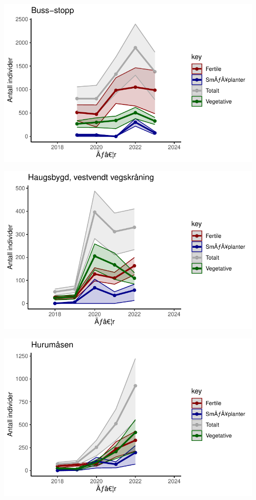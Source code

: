 \documentclass[
  letterpaper,
  DIV=11,
  numbers=noendperiod]{scrreport}
\begin{document}
\includegraphics{localEst_files/figure-pdf/unnamed-chunk-5-2.pdf}

\includegraphics{localEst_files/figure-pdf/unnamed-chunk-5-3.pdf}

\includegraphics{localEst_files/figure-pdf/unnamed-chunk-5-4.pdf}
\end{document}
